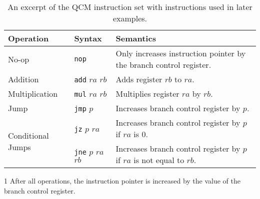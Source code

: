 \begin{table}[htp]
    \centering
    \begin{threeparttable}[b]
        \begin{tabular}{llp{}}
            \multicolumn{1}{l|}{Operation}                          & \multicolumn{1}{l|}{Syntax}                                      & Semantics\tnote{1}                                                              \\ \hline
            
            \multicolumn{1}{l|}{No-op}                              & \multicolumn{1}{l|}{\texttt{nop}}               & Only increases instruction pointer by the branch control register.     \\ \hline
            
            \multicolumn{1}{l|}{Addition}                           & \multicolumn{1}{l|}{\texttt{add} $ra$ $rb$}     & Adds register $rb$ to $ra$.                                            \\
            \multicolumn{1}{l|}{Multiplication}                     & \multicolumn{1}{l|}{\texttt{mul} $ra$ $rb$}     & Multiplies register $ra$ by $rb$.                                      \\ \hline
            
            \multicolumn{1}{l|}{Jump}                               & \multicolumn{1}{l|}{\texttt{jmp} $p$}           & Increases branch control register by $p$.                              \\
            \multicolumn{1}{l|}{\multirow{2}{*}{Conditional Jumps}} & \multicolumn{1}{l|}{\texttt{jz} $p$ $ra$}       & Increases branch control register by $p$ if $ra$ is $0$.               \\
            \multicolumn{1}{l|}{}                                   & \multicolumn{1}{l|}{\texttt{jne} $p$ $ra$ $rb$} & Increases branch control register by $p$ if $ra$ is not equal to $rb$. 
        \end{tabular}
        \caption{An excerpt of the QCM instruction set with instructions used in later examples.}
        \label{tab:qcm_instructionset}
        \begin{tablenotes}
            \item [1] After all operations, the instruction pointer is increased by the value of the branch control register.
        \end{tablenotes}
    \end{threeparttable}
\end{table}

